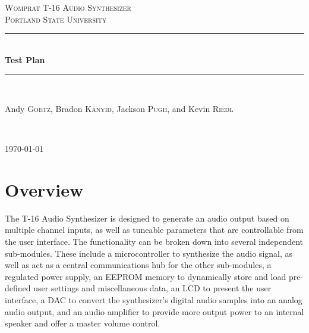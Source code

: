 \documentclass{article}
\newcommand{\HRule}{\rule{\linewidth}{0.5mm}}
\begin{document}
\newenvironment{frcseries}{\fontfamily{frc}\selectfont}{}
\newcommand{\textfrc}[1]{{\frcseries#1}}
\newcommand{\mathfrc}[1]{\text{\textfrc{#1}}}

\begin{titlepage}
 
\begin{center}
 
 
\textsc{\LARGE Womprat T-16 Audio Synthesizer}\\[1.5cm]
 
\textsc{\Large Portland State University}\\[0.5cm]
 
 
\HRule \\[0.4cm]
{ \huge \bfseries Test Plan}\\[0.4cm]
 
\HRule \\[1.5cm]
 
\begin{minipage}{0.4\textwidth}
\begin{center} \large
Andy \textsc{Goetz}, Bradon \textsc{Kanyid}, Jackson \textsc{Pugh}, and Kevin \textsc{Riedl}\\
\end{center}
\end{minipage}

 

 
 
\end{center}
\vfill
{ \textit{} }\\[4.0cm]
\begin{center}
{\large \today}

\end{center} 
\end{titlepage}


\section{Overview}

The T-16 Audio Synthesizer is designed to generate an audio output based on multiple channel inputs, as well as tuneable parameters that are controllable from the user interface.  The functionality can be broken down into several independent sub-modules.  These include a microcontroller to synthesize the audio signal, as well as act as a central communications hub for the other sub-modules, a regulated power supply, an EEPROM memory to dynamically store and load pre-defined user settings and miscellaneous data, an LCD to present the user interface, a DAC to convert the synthesizer's digital audio samples into an analog audio output, and an audio amplifier to provide more output power to an internal speaker and offer a master volume control. 
\end{document}
